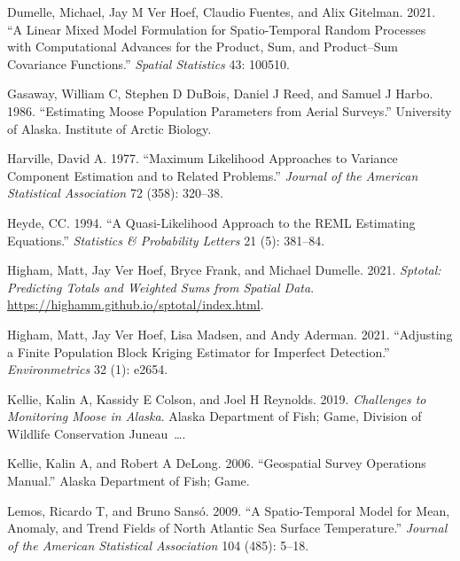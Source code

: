 \documentclass[smallextended]{svjour3}       %
\newlength{\cslhangindent}
\newlength{\cslentryspacingunit} %
\newenvironment{CSLReferences}[2] %
 {%
  \setlength{\parindent}{0pt}
  \ifodd #1
  \let\oldpar\par
  \def\par{\hangindent=\cslhangindent\oldpar}
  \fi
  \setlength{\parskip}{#2\cslentryspacingunit}
 }%
 {}
\begin{document}
\begin{CSLReferences}{1}{0}
\leavevmode{}%
Dumelle, Michael, Jay M Ver Hoef, Claudio Fuentes, and Alix Gitelman.
2021. {``A Linear Mixed Model Formulation for Spatio-Temporal Random
Processes with Computational Advances for the Product, Sum, and
Product--Sum Covariance Functions.''} \emph{Spatial Statistics} 43:
100510.

\leavevmode{}%
Gasaway, William C, Stephen D DuBois, Daniel J Reed, and Samuel J Harbo.
1986. {``Estimating Moose Population Parameters from Aerial Surveys.''}
University of Alaska. Institute of Arctic Biology.

\leavevmode{}%
Harville, David A. 1977. {``Maximum Likelihood Approaches to Variance
Component Estimation and to Related Problems.''} \emph{Journal of the
American Statistical Association} 72 (358): 320--38.

\leavevmode{}%
Heyde, CC. 1994. {``A Quasi-Likelihood Approach to the REML Estimating
Equations.''} \emph{Statistics \& Probability Letters} 21 (5): 381--84.

\leavevmode{}%
Higham, Matt, Jay Ver Hoef, Bryce Frank, and Michael Dumelle. 2021.
\emph{Sptotal: Predicting Totals and Weighted Sums from Spatial Data}.
\url{https://highamm.github.io/sptotal/index.html}.

\leavevmode{}%
Higham, Matt, Jay Ver Hoef, Lisa Madsen, and Andy Aderman. 2021.
{``Adjusting a Finite Population Block Kriging Estimator for Imperfect
Detection.''} \emph{Environmetrics} 32 (1): e2654.

\leavevmode{}%
Kellie, Kalin A, Kassidy E Colson, and Joel H Reynolds. 2019.
\emph{Challenges to Monitoring Moose in Alaska}. Alaska Department of
Fish; Game, Division of Wildlife Conservation Juneau~\ldots.

\leavevmode{}%
Kellie, Kalin A, and Robert A DeLong. 2006. {``Geospatial Survey
Operations Manual.''} Alaska Department of Fish; Game.

\leavevmode{}%
Lemos, Ricardo T, and Bruno Sansó. 2009. {``A Spatio-Temporal Model for
Mean, Anomaly, and Trend Fields of North Atlantic Sea Surface
Temperature.''} \emph{Journal of the American Statistical Association}
104 (485): 5--18.


\end{CSLReferences}
\end{document}
